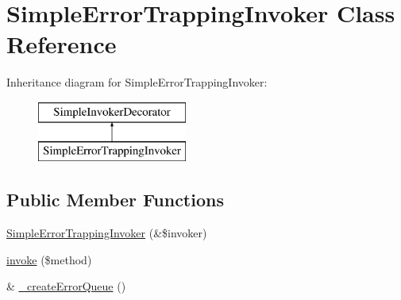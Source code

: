 \hypertarget{class_simple_error_trapping_invoker}{
\section{SimpleErrorTrappingInvoker Class Reference}
\label{class_simple_error_trapping_invoker}
}
Inheritance diagram for SimpleErrorTrappingInvoker:\begin{figure}[H]
\begin{center}
\leavevmode
\includegraphics[height=2.000000cm]{class_simple_error_trapping_invoker}
\end{center}
\end{figure}
\subsection*{Public Member Functions}
\begin{DoxyCompactItemize}
\item 
\hyperlink{class_simple_error_trapping_invoker_af403fe699963304b0d95f4bc1366d6b8}{SimpleErrorTrappingInvoker} (\&\$invoker)
\item 
\hyperlink{class_simple_error_trapping_invoker_ad9122507df8d27c3b7ab8fd1ecb53e45}{invoke} (\$method)
\item 
\& \hyperlink{class_simple_error_trapping_invoker_a721fa4b7d6c984e87648c5d3b08e35e1}{\_\-createErrorQueue} ()
\end{DoxyCompactItemize}


